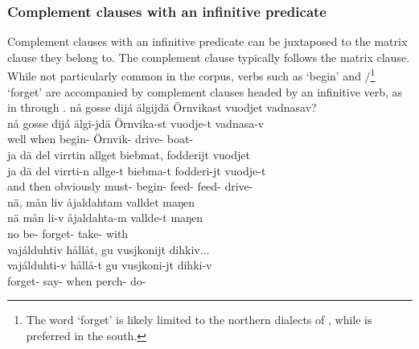 \subsubsection{Complement clauses with an infinitive predicate}\label{infinitiveComplementClauses}
Complement clauses with an infinitive predicate can be juxtaposed to the matrix clause they belong to. The complement clause typically follows the matrix clause. 
While not particularly common in the corpus, verbs such as  ‘begin’ and /\footnote{The word  ‘forget’ is likely limited to the northern dialects of \PS, while  is preferred in the south.} 
‘forget’ %
are accompanied by complement clauses headed by an infinitive verb, %
as in  through .
\ea\label{complClauseJuxInf1}
\glll	nå gosse dijá älgijdä Örnvikast vuodjet vadnasav?\\
	nå gosse dijá älgi-jdä Örnvika-st vuodje-t vadnasa-v\\
	well when  begin- Örnvik- drive- boat-\\\nopagebreak
{} 
\z
\ea\label{complClauseJuxInf2}
\glll	ja dä del virrtin allget biebmat, fodderijt vuodjet\\
	ja dä del virrti-n allge-t biebma-t fodderi-jt vuodje-t\\
	and then obviously must- begin- feed- feed- drive-\\\nopagebreak
{} 
\z
\ea\label{complClauseJuxInf3}%
\glll	nä, mån liv åjaldahtam valldet maŋen\\
	nä mån li-v åjaldahta-m vallde-t maŋen\\
	no  be- forget- take- with\\\nopagebreak
{} 
\z
\ea\label{complClauseJuxInf4}%
\glll	vajálduhtiv hållåt, gu vusjkonijt dihkiv...\\
	vajálduhti-v hållå-t gu vusjkoni-jt dihki-v\\
	forget- say- when perch- do-\\\nopagebreak
{} 
\z



